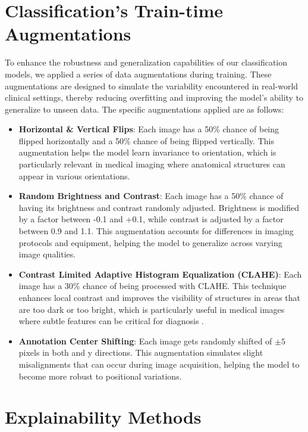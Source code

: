 \section{Classification's Train-time Augmentations}
To enhance the robustness and generalization capabilities of our classification models, we applied a series of data augmentations during training. These augmentations are designed to simulate the variability encountered in real-world clinical settings, thereby reducing overfitting and improving the model's ability to generalize to unseen data. The specific augmentations applied are as follows:
\begin{itemize}
    \item \textbf{Horizontal \& Vertical Flips}: Each image has a 50\% chance of being flipped horizontally and a 50\% chance of being flipped vertically. This augmentation helps the model learn invariance to orientation, which is particularly relevant in medical imaging where anatomical structures can appear in various orientations.
    \item \textbf{Random Brightness and Contrast}: Each image has a 50\% chance of having its brightness and contrast randomly adjusted. Brightness is modified by a factor between -0.1 and +0.1, while contrast is adjusted by a factor between 0.9 and 1.1. This augmentation accounts for differences in imaging protocols and equipment, helping the model to generalize across varying image qualities.
    \item \textbf{Contrast Limited Adaptive Histogram Equalization (CLAHE)}: Each image has a 30\% chance of being processed with CLAHE. This technique enhances local contrast and improves the visibility of structures in areas that are too dark or too bright, which is particularly useful in medical images where subtle features can be critical for diagnosis \cite{mishra2021clahe}.
    \item \textbf{Annotation Center Shifting}: Each image gets randomly shifted of $\pm 5$ pixels in both and y directions. This augmentation simulates slight misalignments that can occur during image acquisition, helping the model to become more robust to positional variations.
\end{itemize}

\section{Explainability Methods}
\label{sec:xai_methods}

